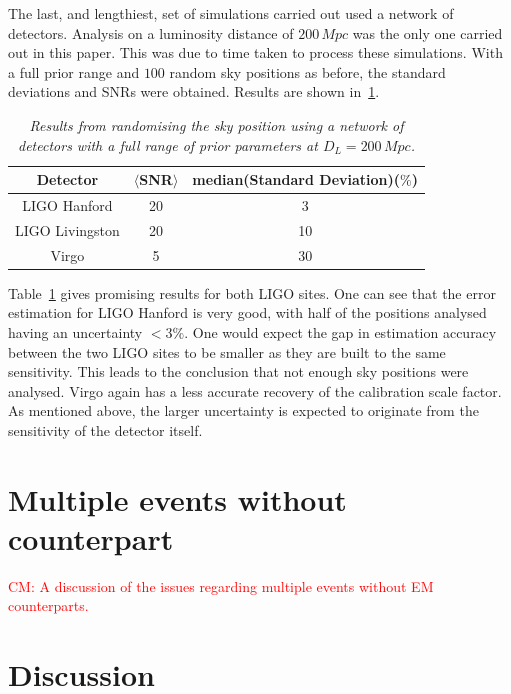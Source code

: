 \documentclass[12pt]{iopart}
\newcommand{\cm}[1]{\textcolor{red}{CM: #1}}
\begin{document}
The last, and lengthiest, set of simulations carried out used a network of
detectors. Analysis on a luminosity distance of $200 \,Mpc$ was the only one
carried out in this paper. This was due to time taken to process these
simulations. With a full prior range and $100$ random sky positions as before,
the standard deviations and SNRs were obtained. Results are shown
in~\ref{tab:mult-rndsp}.


\begin{table}
\centering
\begin{tabular}[H]{|c|c|c|}
\hline
  Detector   & $\langle$SNR$\rangle$ & median(Standard Deviation)($\%$)\\
\hline
LIGO Hanford & 20& 3 \\
LIGO Livingston & 20 & 10 \\
Virgo & 5 & 30\\
\hline
\end{tabular}
\caption{\textit{Results from randomising the sky position using a network of
detectors with a full range of prior parameters at $D_{L} = 200\, Mpc$.}}
\label{tab:mult-rndsp}
\end{table}


Table~\ref{tab:mult-rndsp} gives promising results for both LIGO sites. One can
see that the error estimation for LIGO Hanford is very good, with half of the
positions analysed having an uncertainty $<3\%$. One would expect the gap in
estimation accuracy between the two LIGO sites to be smaller as they are built
to the same sensitivity. This leads to the conclusion that not enough sky
positions were analysed. Virgo again has a less accurate recovery of the
calibration scale factor. As mentioned above, the larger uncertainty is
expected to originate from the sensitivity of the detector itself.



\section{Multiple events without counterpart\label{sec:multiple}}

\cm{A discussion of the issues regarding multiple events
without EM counterparts.}

\section{Discussion\label{sec:discussion}}
\end{document}
